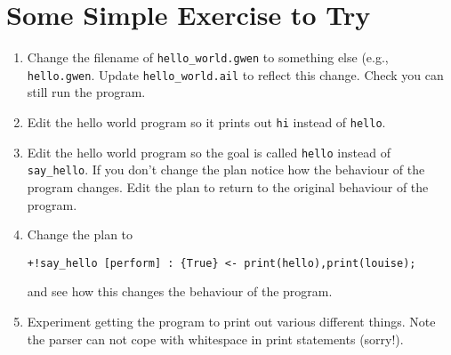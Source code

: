 \documentclass[a4]{article}
\begin{document}
\section{Some Simple Exercise to Try}
\begin{enumerate}
\item Change the filename of \texttt{hello\_world.gwen} to something else (e.g., \texttt{hello.gwen}.  Update \texttt{hello\_world.ail} to reflect this change.  Check you can still run the program.
\item Edit the hello world program so it prints out \texttt{hi} instead of \texttt{hello}.
\item Edit the hello world program so the goal is called \texttt{hello} instead of \texttt{say\_hello}.  If you don't change the plan notice how the behaviour of the program changes.  Edit the plan to return to the original behaviour of the program.
\item Change the plan to
\begin{verbatim}
+!say_hello [perform] : {True} <- print(hello),print(louise);
\end{verbatim} and see how this changes the behaviour of the program.
\item Experiment getting the program to print out various different things.  Note the parser can not cope with whitespace in print statements (sorry!).
\end{enumerate}
\end{document}
